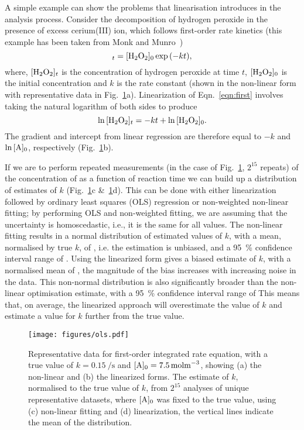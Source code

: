 \documentclass[journal=jceda8,manuscript=article]{achemso}
\begin{document}
A simple example can show the problems that linearisation introduces in the analysis process.
Consider the decomposition of hydrogen peroxide  in the presence of excess cerium(III) ion, which follows first-order rate kinetics (this example has been taken from Monk and Munro~\cite{monk_math_2010})
%
\begin{equation}
    [\ce{H2O2}]_t = [\ce{H2O2}]_0\exp{(-kt)},
    \label{eqn:first}
\end{equation}
%
where, $[\ce{H2O2}]_t$ is the concentration of hydrogen peroxide at time $t$, $[\ce{H2O2}]_0$ is the initial concentration and $k$ is the rate constant (shown in the non-linear form with representative data in Fig.~\ref{fig:ols}a).
Linearization of Eqn.~\ref{eqn:first} involves taking the natural logarithm of both sides to produce
%
\begin{equation}
    \ln{[\ce{H2O2}]_t} = -kt + \ln{[\ce{H2O2}]_0}.
\end{equation}
%
The gradient and intercept from linear regression are therefore equal to $-k$ and $\ln{[\ce{A}]_0}$, respectively (Fig.~\ref{fig:ols}b).

If we are to perform repeated measurements (in the case of Fig.~\ref{fig:ols}, $2^{15}$ repeats) of the concentration of  as a function of reaction time we can build up a distribution of estimates of $k$ (Fig.~\ref{fig:ols}c \&~\ref{fig:ols}d). 
This can be done with either linearization followed by ordinary least squares (OLS) regression or non-weighted non-linear fitting; by performing OLS and non-weighted fitting, we are assuming that the uncertainty is homoscedastic, i.e., it is the same for all values. 
The non-linear fitting results in a normal distribution of estimated values of $k$, with a mean, normalised by true $k$, of , i.e. the estimation is unbiased, and a \SI{95}{\percent} confidence interval range of .
Using the linearized form gives a biased estimate of $k$, with a normalised mean of , the magnitude of the bias increases with increasing noise in the data.
This non-normal distribution is also significantly broader than the non-linear optimisation estimate, with a \SI{95}{\percent} confidence interval range of 
This means that, on average, the linearized approach will overestimate the value of $k$ and estimate a value for $k$ further from the true value. 
%
\begin{figure}
  \texttt{[image: figures/ols.pdf]}
  \caption{
    Representative data for first-order integrated rate equation, with a true value of $k=\SI{0.15}{\per\second}$ and $[\ce{A}]_0=\SI{7.5}{\mol\m^{-3}}$, showing (a) the non-linear and (b) the linearized forms. 
    The estimate of $k$, normalised to the true value of $k$, from $2^{15}$ analyses of unique representative datasets, where $[\ce{A}]_0$ was fixed to the true value, using (c) non-linear fitting and (d) linearization, the vertical lines indicate the mean of the distribution. 
    }
  \label{fig:ols}
\end{figure}
%
\end{document}
